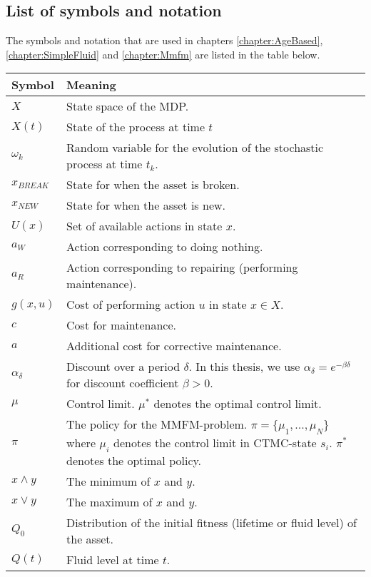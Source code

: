 \documentclass[a4paper]{thesis}
\theoremstyle{definition}
\begin{document}
	\begin{appendices}
		\chapter{List of symbols and notation}\label{AppendixSymbolsAndNotation}
		The symbols and notation that are used in chapters \ref{chapter:AgeBased}, \ref{chapter:SimpleFluid} and \ref{chapter:Mmfm} are listed in the table below.
		\begin{tabularx}{\linewidth}{l|L}\label{table:Symbols}
			Symbol        & Meaning         \\
			\hline                       
			$X$			& State space of the MDP. \\
			$X(t)$ & State of the process at time $t$ \\
			$\omega_k$ & Random variable for the evolution of the stochastic process at time $t_k$.\\   
			$x_{BREAK}$ & State for when the asset is broken.           \\
			$x_{NEW}$ & State for when the asset is new.\\   
			$U(x)$& Set of available actions in state $x$.\\
			$a_W$& Action corresponding to doing nothing.\\
			$a_R$& Action corresponding to repairing (performing maintenance). \\
			$g(x,u)$    & Cost of performing action $u$ in state $x\in X$.\\
			$c$& Cost for maintenance.\\
			$a$& Additional cost for corrective maintenance.\\
			$\alpha_\delta$ & Discount over a period $\delta$. In this thesis, we use $\alpha_\delta=e^{-\beta \delta}$ for discount coefficient $\beta>0$.\\       
			$\mu$ & Control limit. $\mu^*$ denotes the optimal control limit.\\
			$\pi$& The policy for the MMFM-problem. $\pi=\{\mu_1,...,\mu_N\}$ where $\mu_i$ denotes the control limit in CTMC-state $s_i$. $\pi^*$ denotes the optimal policy.\\
			$x\wedge y$   & The minimum of $x$ and $y$.          \\       
			$x\vee y$     & The maximum of $x$ and $y$.\\
			$Q_0$ & Distribution of the initial fitness (lifetime or fluid level) of the asset.\\
			$Q(t)$& Fluid level at time $t$.\\

\end{tabularx}
\end{appendices}
\end{document}
